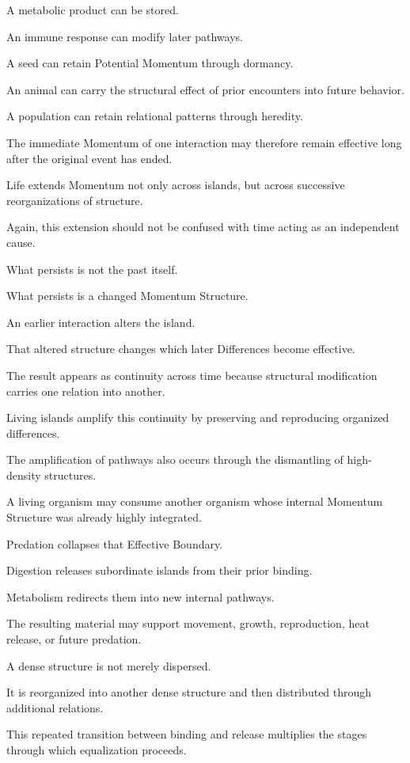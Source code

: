 A metabolic product can be stored.

An immune response can modify later pathways.

A seed can retain Potential Momentum through dormancy.

An animal can carry the structural effect of prior encounters into future behavior.

A population can retain relational patterns through heredity.

The immediate Momentum of one interaction may therefore remain effective long after the original event has ended.

Life extends Momentum not only across islands, but across successive reorganizations of structure.

Again, this extension should not be confused with time acting as an independent cause.

What persists is not the past itself.

What persists is a changed Momentum Structure.

An earlier interaction alters the island.

That altered structure changes which later Differences become effective.

The result appears as continuity across time because structural modification carries one relation into another.

Living islands amplify this continuity by preserving and reproducing organized differences.

The amplification of pathways also occurs through the dismantling of high-density structures.

A living organism may consume another organism whose internal Momentum Structure was already highly integrated.

Predation collapses that Effective Boundary.

Digestion releases subordinate islands from their prior binding.

Metabolism redirects them into new internal pathways.

The resulting material may support movement, growth, reproduction, heat release, or future predation.

A dense structure is not merely dispersed.

It is reorganized into another dense structure and then distributed through additional relations.

This repeated transition between binding and release multiplies the stages through which equalization proceeds.

